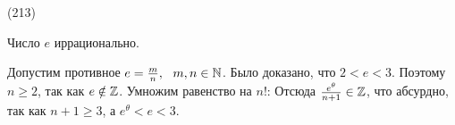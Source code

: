 (213)

\T \q Число $e$ иррационально.

\D Допустим противное $e = \frac mn,\ \  m, n \in \mathbb{N}$. Было доказано, что $2 < e < 3$. Поэтому $n \ge 2$, так как $e \notin \mathbb{Z}$. Умножим равенство на $n!$:  Отсюда $\frac{e^\theta}{n + 1} \in \mathbb{Z}$, что абсурдно, так как $n + 1 \ge 3$, а $e^\theta < e < 3$.